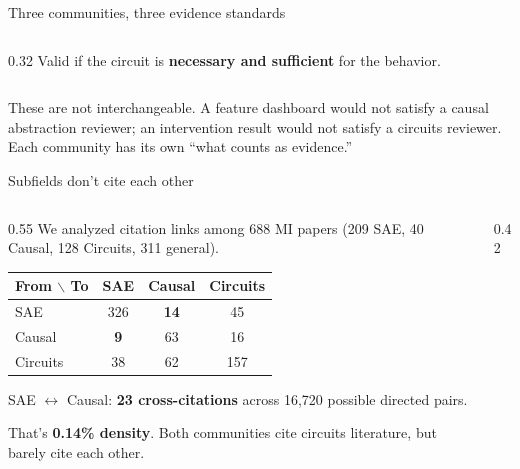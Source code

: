 \documentclass[aspectratio=169,11pt]{beamer}
\begin{document}
\begin{frame}[label=threecommunities]{Three communities, three evidence standards}
\begin{columns}[T]
\begin{column}{0.32\textwidth}
\vspace{0.3em}
{\scriptsize Valid if the circuit is \textbf{necessary and sufficient} for the behavior.}
\end{column}
\end{columns}

\vspace{0.5em}
{\small These are not interchangeable. A feature dashboard would not satisfy a causal abstraction reviewer; an intervention result would not satisfy a circuits reviewer. Each community has its own ``what counts as evidence.''}
\end{frame}

\begin{frame}{Subfields don't cite each other}
\begin{columns}[T]
\begin{column}{0.55\textwidth}
{\small We analyzed citation links among 688 MI papers (209 SAE, 40 Causal, 128 Circuits, 311 general).}

\vspace{0.5em}
{\small
\begin{tabular}{lccc}
\toprule
\textbf{From $\backslash$ To} & \textbf{\textcolor{sae}{SAE}} & \textbf{\textcolor{causal}{Causal}} & \textbf{\textcolor{circuits}{Circuits}} \\
\midrule
\textcolor{sae}{SAE} & 326 & \textcolor{fail}{\textbf{14}} & 45 \\
\textcolor{causal}{Causal} & \textcolor{fail}{\textbf{9}} & 63 & 16 \\
\textcolor{circuits}{Circuits} & 38 & 62 & 157 \\
\bottomrule
\end{tabular}
}

\vspace{0.5em}
{\small SAE $\leftrightarrow$ Causal: \textbf{23 cross-citations} across 16,720 possible directed pairs.}

\vspace{0.3em}
{\small That's \textbf{0.14\% density}. Both communities cite circuits literature, but barely cite each other.}
\end{column}
\begin{column}{0.42\textwidth}
\centering
\vspace{0.5em}
\end{column}
\end{columns}
\end{frame}
\end{document}
